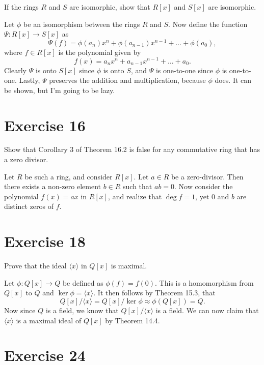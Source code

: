 \documentclass[12pt]{article}
\begin{document}
If the rings $R$ and $S$ are isomorphic, show that $R[x]$
and $S[x]$ are isomorphic.

Let $\phi$ be an isomorphism between the rings $R$ and $S$.
Now define the function $\Psi:R[x]\to S[x]$ as
\begin{equation*}
\Psi(f) = \phi(a_n)x^n+\phi(a_{n-1})x^{n-1}+\dots+\phi(a_0),
\end{equation*}
where $f\in R[x]$ is the polynomial given by
\begin{equation*}
f(x)=a_nx^n+a_{n-1}x^{n-1}+\dots+a_0.
\end{equation*}
Clearly $\Psi$ is onto $S[x]$ since $\phi$ is onto $S$,
and $\Psi$ is one-to-one since $\phi$ is one-to-one.
Lastly, $\Psi$ preserves the addition and multiplication,
because $\phi$ does.  It can be shown, but I'm going to be lazy.

\section*{Exercise 16}

Show that Corollary 3 of Theorem 16.2 is false for any commutative
ring that has a zero divisor.

Let $R$ be such a ring, and consider $R[x]$.  Let $a\in R$ be
a zero-divisor.  Then there exists a non-zero element $b\in R$
such that $ab=0$.  Now consider the polynomial $f(x)=ax$ in $R[x]$,
and realize that $\deg f=1$, yet $0$ and $b$ are distinct zeros of $f$.

\section*{Exercise 18}

Prove that the ideal $\langle x\rangle$ in $Q[x]$ is maximal.

Let $\phi:Q[x]\to Q$
be defined as $\phi(f)=f(0)$.  This is a homomorphism from
$Q[x]$ to $Q$ and $\ker\phi=\langle x\rangle$.
It then follows by Theorem 15.3, that
\begin{equation*}
Q[x]/\langle x\rangle=Q[x]/\ker\phi\approx \phi(Q[x])=Q.
\end{equation*}
Now since $Q$ is a field, we know that $Q[x]/\langle x\rangle$
is a field.  We can now claim that $\langle x\rangle$ is a maximal
ideal of $Q[x]$ by Theorem 14.4.

\section*{Exercise 24}
\end{document}
